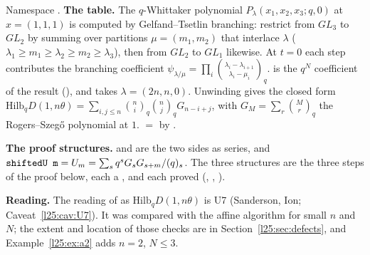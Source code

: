 \begin{dictionary}
Namespace . \textbf{The table.} The $q$-Whittaker polynomial
$P_\lambda(x_1,x_2,x_3;q,0)$ at $x=(1,1,1)$ is computed by Gelfand--Tsetlin branching: restrict from $GL_3$ to $GL_2$ by
summing over partitions $\mu=(m_1,m_2)$ that interlace $\lambda$ ($\lambda_1\ge m_1\ge\lambda_2\ge m_2\ge\lambda_3$), then
from $GL_2$ to $GL_1$ likewise. At $t=0$ each step contributes the branching coefficient
$\psi_{\lambda/\mu}=\prod_i\binom{\lambda_i-\lambda_{i+1}}{\lambda_i-\mu_i}_q$.  is the $q^N$
coefficient of the result (), and  takes $\lambda=(2n,n,0)$.
Unwinding gives the closed form $\mathrm{Hilb}_qD(1,n\theta)=\sum_{i,j\le n}\binom ni_q\binom nj_qG_{n-i+j}$, with
$G_M=\sum_r\binom Mr_q$ the Rogers--Szeg\H{o} polynomial at $1$.  $=$
 by .

\textbf{The proof structures.}  and  are the two sides as series, and
$\lean{shiftedU m}=U_m=\sum_sq^sG_sG_{s+m}/(q)_s$. The three structures are the three steps of the proof below, each a
, and each proved (, , ).

\textbf{Reading.} The reading of  as $\mathrm{Hilb}_qD(1,n\theta)$ is U7 (Sanderson, Ion;
Caveat~\ref{l25:cav:U7}). It was compared with the affine algorithm  for small $n$ and $N$;
the extent and location of those checks are in Section~\ref{l25:sec:defects}, and Example~\ref{l25:ex:a2} adds $n=2$,
$N\le3$.
\end{dictionary}
